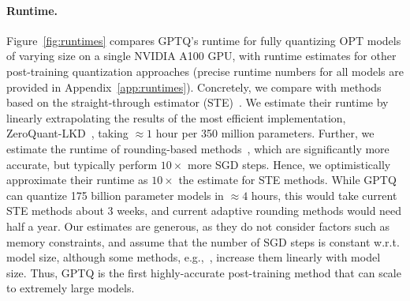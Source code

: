 \paragraph{Runtime.} Figure~\ref{fig:runtimes} compares GPTQ's runtime for fully quantizing OPT models of varying size on a single NVIDIA A100 GPU, with runtime estimates for other post-training quantization approaches (precise runtime numbers for all models are provided in Appendix~\ref{app:runtimes}). Concretely, we compare with methods based on the straight-through estimator (STE)~\cite{yao2022zeroquant, hubara2021accurate}. We estimate their runtime by linearly extrapolating the results of the most efficient implementation, ZeroQuant-LKD~\cite{yao2022zeroquant}, taking $\approx 1$ hour per 350 million parameters.
Further, we estimate the runtime of rounding-based methods~\cite{nagel2020up, li2021brecq}, which are significantly more accurate, but typically perform $10\times$ more SGD steps. 
Hence, we optimistically approximate their runtime as $10\times$ the estimate for STE methods. 
While GPTQ can quantize 175 billion parameter models in $\approx 4$ hours, this would take current STE methods about 3 weeks, and current adaptive rounding methods would need half a year. 
Our estimates are generous, as they do not consider factors such as memory constraints, and assume that the number of SGD steps is constant w.r.t. model size, although some methods, e.g.,~\cite{yao2022zeroquant}, increase them linearly with model size. Thus, GPTQ is the first highly-accurate post-training method that can scale to extremely large models. 

